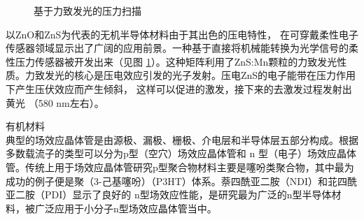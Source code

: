 \documentclass[UTF8,9pt]{ctexart}
\begin{document}
{\begin{figure}[htbp]
        \caption{基于力致发光的压力扫描}
        \label{rx3} 
    \end{figure}
    以ZnO和ZnS为代表的无机半导体材料由于其出色的压电特性， 在可穿戴柔性电子传感器领域显示出了广阔的应用前景。一种基于直接将机械能转换为光学信号的柔性压力传感器被开发出来（见图 \ref{rx3}）。这种矩阵利用了ZnS:Mn颗粒的力致发光性质。力致发光的核心是压电效应引发的光子发射。压电ZnS的电子能带在压力作用下产生压伏效应而产生倾斜， 这样可以促进的激发，接下来的去激发过程发射出黄光 （580 nm左右）。

    \item 有机材料\\
    典型的场效应晶体管是由源极、漏极、栅极、介电层和半导体层五部分构成。根据多数载流子的类型可以分为p型（空穴）场效应晶体管和 n 型（电子）场效应晶体管。传统上用于场效应晶体管研究p型聚合物材料主要是噻吩类聚合物，其中最为成功的例子便是聚（3-己基噻吩）（P3HT）体系。萘四酰亚二胺（NDI）和苝四酰亚二胺（PDI）显示了良好的 n型场效应性能，是研究最为广泛的n型半导体材料，被广泛应用于小分子n型场效应晶体管当中。

}
\end{document}
